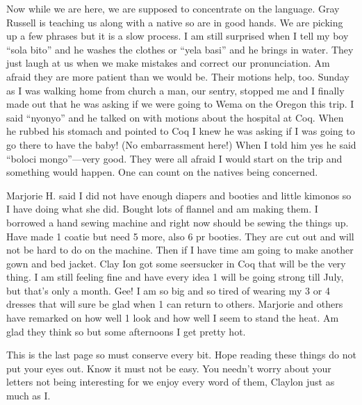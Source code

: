 \documentclass[
]{book}
\begin{document}
Now while we are here, we are supposed to concentrate on the language. Gray Russell is teaching us along with a native so are in good hands. We are picking up a few phrases but it is a slow process. I am still surprised when I tell my boy ``sola bito'' and he washes the clothes or ``yela basi'' and he brings in water. They just laugh at us when we make mistakes and correct our pronunciation. Am afraid they are more patient than we would be. Their motions help, too. Sunday as I was walking home from church a man, our sentry, stopped me and I finally made out that he was asking if we were going to Wema on the Oregon this trip. I said ``nyonyo'' and he talked on with motions about the hospital at Coq. When he rubbed his stomach and pointed to Coq I knew he was asking if I was going to go there to have the baby! (No embarrassment here!) When I told him yes he said ``boloci mongo''---very good. They were all afraid I would start on the trip and something would happen. One can count on the natives being concerned.

Marjorie H. said I did not have enough diapers and booties and little kimonos so I have doing what she did. Bought lots of flannel and am making them. I borrowed a hand sewing machine and right now should be sewing the things up. Have made 1 coatie but need 5 more, also 6 pr booties. They are cut out and will not be hard to do on the machine. Then if I have time am going to make another gown and bed jacket. Clay Ion got some seersucker in Coq that will be the very thing. I am still feeling fine and have every idea 1 will be going strong till July, but that's only a month. Gee! I am so big and so tired of wearing my 3 or 4 dresses that will sure be glad when 1 can return to others. Marjorie and others have remarked on how well 1 look and how well I seem to stand the heat. Am glad they think so but some afternoons I get pretty hot.

This is the last page so must conserve every bit. Hope reading these things do not put your eyes out. Know it must not be easy. You needn't worry about your letters not being interesting for we enjoy every word of them, Claylon just as much as I.
\end{document}

